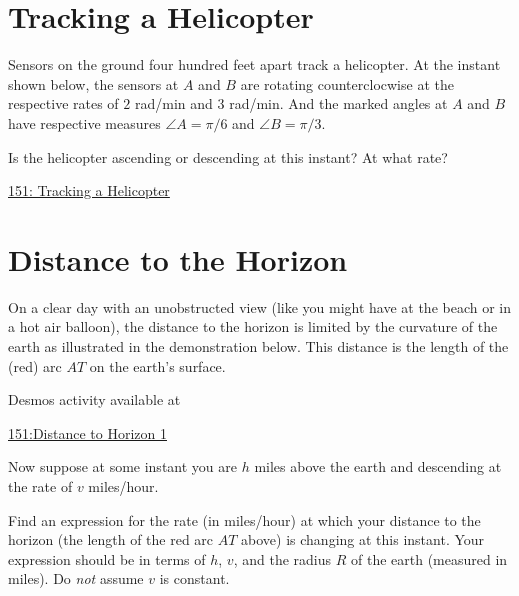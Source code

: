\documentclass{ximera}
\begin{document}
\section{Tracking a Helicopter}
Sensors on the ground four hundred feet apart track a helicopter. At the instant shown below, the sensors at $A$ and $B$ are rotating counterclocwise at the respective rates of $2$ rad/min and $3$ rad/min. And the marked angles at $A$ and $B$ have respective measures $\angle A = \pi/6$ and $\angle B = \pi/3$.

Is the helicopter ascending or descending at this instant? At what rate?

 
\begin{onlineOnly}
   \begin{center}
\end{center}
\end{onlineOnly}

\href{https://www.desmos.com/calculator/xl8t3toppg}{151: Tracking a Helicopter}



\section{Distance to the Horizon}

\begin{question}  \label{Qthhvhrdfgbyt}
On a clear day with an unobstructed view (like you might have at the beach or in a hot air balloon), the distance to the horizon is limited by the curvature of the earth as illustrated in the demonstration below. This distance is the length of the (red) arc $AT$ on the earth's surface. 


 
\begin{onlineOnly}
    \begin{center}
\end{center}
\end{onlineOnly}

Desmos activity available at

\href{https://www.desmos.com/calculator/ewowig5sgk}{151:Distance to Horizon 1}

Now suppose at some instant you are $h$ miles above the earth and descending at the rate of $v$ miles/hour. 

Find an expression for the rate (in miles/hour) at which your distance to the horizon (the length of the red arc $AT$ above) is changing at this instant. Your expression should be in terms of $h$, $v$, and the radius $R$ of the earth (measured in miles). Do \emph{not} assume $v$ is constant.

\end{question}
\end{document}
